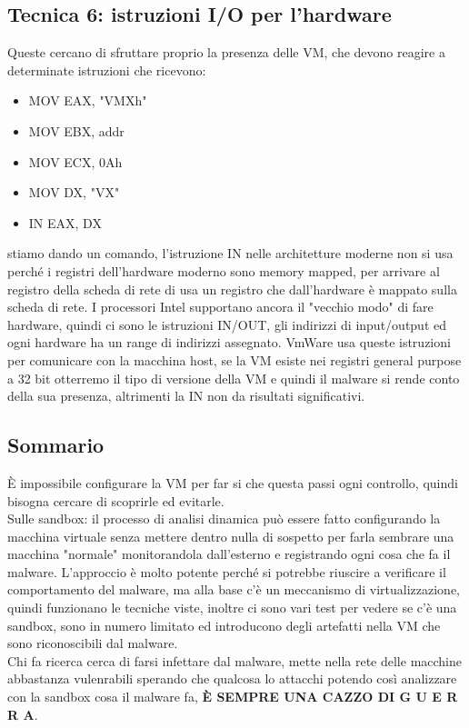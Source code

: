 \documentclass[12pt, oneside]{extbook}
\begin{document}
\subsection{Tecnica 6: istruzioni I/O per l'hardware}
Queste cercano di sfruttare proprio la presenza delle VM, che devono reagire a determinate istruzioni che ricevono:
\begin{itemize}
\item MOV EAX, "VMXh"
\item MOV EBX, addr
\item MOV ECX, 0Ah
\item MOV DX, "VX"
\item IN EAX, DX
\end{itemize}
stiamo dando un comando, l'istruzione IN nelle architetture moderne non si usa perché i registri dell'hardware moderno sono memory mapped, per arrivare al registro della scheda di rete di usa un registro che dall'hardware è mappato sulla scheda di rete. I processori Intel supportano ancora il "vecchio modo" di fare hardware, quindi ci sono le istruzioni IN/OUT, gli indirizzi di input/output ed ogni hardware ha un range di indirizzi assegnato. VmWare usa queste istruzioni per comunicare con la macchina host, se la VM esiste nei registri general purpose a 32 bit otterremo il tipo di versione della VM e quindi il malware si rende conto della sua presenza, altrimenti la IN non da risultati significativi.
\subsection{Sommario}
È impossibile configurare la VM per far si che questa passi ogni controllo, quindi bisogna cercare di scoprirle ed evitarle.\\Sulle sandbox: il processo di analisi dinamica può essere fatto configurando la macchina virtuale senza mettere dentro nulla di sospetto per farla sembrare una macchina "normale" monitorandola dall'esterno e registrando ogni cosa che fa il malware. L'approccio è molto potente perché si potrebbe riuscire a verificare il comportamento del malware, ma alla base c'è un meccanismo di virtualizzazione, quindi funzionano le tecniche viste, inoltre ci sono vari test per vedere se c'è una sandbox, sono in numero limitato ed introducono degli artefatti nella VM che sono riconoscibili dal malware.\\Chi fa ricerca cerca di farsi infettare dal malware, mette nella rete delle macchine abbastanza vulenrabili sperando che qualcosa lo attacchi potendo così analizzare con la sandbox cosa il malware fa, \textbf{\textsf{È SEMPRE UNA CAZZO DI G U E R R A}}.
\end{document}
